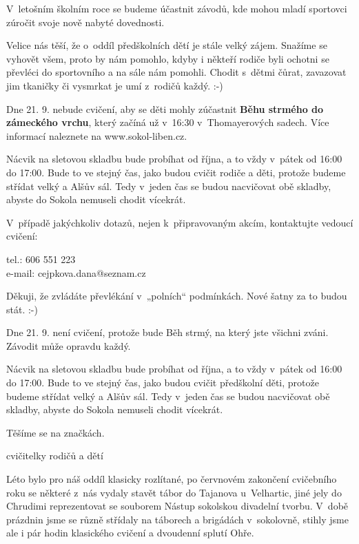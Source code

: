 \documentclass[11pt]{article}
\begin{document}
V~letošním školním roce se budeme účastnit závodů, kde mohou mladí sportovci zúročit svoje nově nabyté dovednosti.

Velice nás těší, že o~oddíl předškolních dětí je stále velký zájem. Snažíme se vyhovět všem, proto by nám pomohlo, kdyby i někteří rodiče byli ochotni se převléci do sportovního a na sále nám pomohli. Chodit s~dětmi čůrat, zavazovat 
jim tkaničky či vysmrkat je umí z~rodičů každý. :-)

Dne 21. 9. nebude cvičení, aby se děti mohly zúčastnit \textbf{Běhu strmého do zámeckého vrchu}, který začíná už v~16:30 v~Thomayerových sadech. Více informací naleznete na www.sokol-liben.cz.

Nácvik na sletovou skladbu bude probíhat od října, a to vždy v~pátek od 16:00 do 17:00. Bude to ve stejný čas, jako budou cvičit rodiče a děti, protože budeme střídat velký a Alšův sál. Tedy v~jeden čas se budou nacvičovat obě skladby, abyste do Sokola nemuseli chodit vícekrát.

V~případě jakýchkoliv dotazů, nejen k~připravovaným akcím, kontaktujte vedoucí cvičení:
 
\signature{Dana Cejpková}{tel.: 606 551 223\\e-mail: cejpkova.dana@seznam.cz}

\vspace*{24pt}

Děkuji, že zvládáte převlékání v~„polních“ podmínkách. Nové šatny za to budou stát. :-)

Dne 21. 9. není cvičení, protože bude Běh strmý, na který jste všichni zváni. Závodit může opravdu každý.

Nácvik na sletovou skladbu bude probíhat od října, a to vždy v~pátek od 16:00 do 17:00. Bude to ve stejný čas, jako budou cvičit předškolní děti, protože budeme střídat velký a Alšův sál. Tedy v~jeden čas se budou nacvičovat obě skladby, abyste do Sokola nemuseli chodit vícekrát.

Těšíme se na značkách.


\signature{Jana, Dana a Jana}{cvičitelky rodičů a dětí}

\vspace*{24pt}

Léto bylo pro náš oddíl klasicky rozlítané, po červnovém zakončení cvičebního roku se některé z~nás vydaly stavět tábor do Tajanova u~Velhartic, jiné jely do Chrudimi reprezentovat se souborem Nástup sokolskou divadelní tvorbu. V~době prázdnin jsme se různě střídaly na táborech a brigádách v~sokolovně, stihly jsme ale i pár hodin klasického cvičení a dvoudenní splutí Ohře. 
\end{document}
